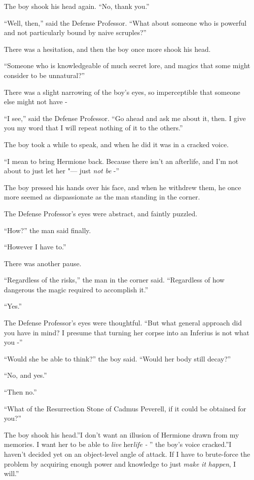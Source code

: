 The boy shook his head again. ``No, thank you.''

``Well, then,'' said the Defense Professor. ``What about someone who is
powerful and not particularly bound by naive scruples?''

There was a hesitation, and then the boy once more shook his head.

``Someone who is knowledgeable of much secret lore, and magics that some
might consider to be unnatural?''

There was a slight narrowing of the boy's eyes, so imperceptible that
someone else might not have -

``I see,'' said the Defense Professor. ``Go ahead and ask me about it,
then. I give you my word that I will repeat nothing of it to the
others.''

The boy took a while to speak, and when he did it was in a cracked
voice.

``I mean to bring Hermione back. Because there isn't an afterlife, and
I'm not about to just let her "--- just \emph{not be} -''

The boy pressed his hands over his face, and when he withdrew them, he
once more seemed as dispassionate as the man standing in the corner.

The Defense Professor's eyes were abstract, and faintly puzzled.

``How?'' the man said finally.

``However I have to.''

There was another pause.

``Regardless of the risks,'' the man in the corner said. ``Regardless of
how dangerous the magic required to accomplish it.''

``Yes.''

The Defense Professor's eyes were thoughtful. ``But what general
approach did you have in mind? I presume that turning her corpse into an
Inferius is not what you -''

``Would she be able to think?'' the boy said. ``Would her body still
decay?''

``No, and yes.''

``Then no.''

``What of the Resurrection Stone of Cadmus Peverell, if it could be
obtained for you?''

The boy shook his head.''I don't want an illusion of Hermione drawn from
my memories. I want her to be able to \emph{live} her\emph{life -} '' the
boy's voice cracked.''I haven't decided yet on an object-level angle of
attack. If I have to brute-force the problem by acquiring enough power
and knowledge to just \emph{make it happen}, I will.''

